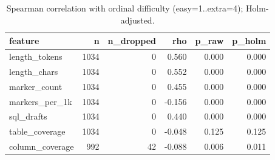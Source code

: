 \begin{table}[htbp]
\caption{Spearman correlation with ordinal difficulty (easy=1..extra=4); Holm-adjusted.}
\label{tab:task2_spearman}
\begin{tabular}{lrrrrr}
\toprule
feature & n & n\_dropped & rho & p\_raw & p\_holm \\
\midrule
length_tokens & 1034 & 0 & 0.560 & 0.000 & 0.000 \\
length_chars & 1034 & 0 & 0.552 & 0.000 & 0.000 \\
marker_count & 1034 & 0 & 0.455 & 0.000 & 0.000 \\
markers_per_1k & 1034 & 0 & -0.156 & 0.000 & 0.000 \\
sql_drafts & 1034 & 0 & 0.440 & 0.000 & 0.000 \\
table_coverage & 1034 & 0 & -0.048 & 0.125 & 0.125 \\
column_coverage & 992 & 42 & -0.088 & 0.006 & 0.011 \\
\bottomrule
\end{tabular}
\end{table}
